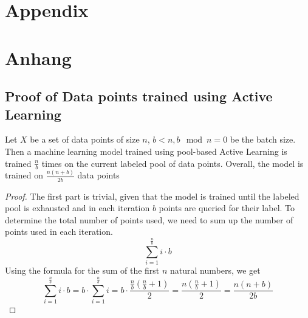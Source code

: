 
{\chapter{Appendix}}    %
{\chapter{Anhang}}      %
\label{chap:appendix}


\section{Proof of Data points trained using Active Learning}
\label{sec:appendix:FirstSection}
\begin{theorem}
Let $X$ be a set of data points of size $n$, $b < n, b \mod n = 0$ be the batch size. Then a machine learning model trained
using pool-based Active Learning is trained $\frac{n}{b}$ times on the current labeled pool of data points. Overall, the model
is trained on $\frac{n(n+b)}{2b}$ data points
\end{theorem}
\begin{proof}
    The first part is trivial, given that the model is trained until the labeled pool is exhausted and in each iteration $b$
    points are queried for their label. To determine the total number of points used, we need to sum up the number of points
    used in each iteration. 
    \begin{equation}
        \sum_{i=1}^{\frac{n}{b}} i \cdot b
    \end{equation}
    Using the formula for the sum of the first $n$ natural numbers, we get
    \begin{equation}
        \sum_{i=1}^{\frac{n}{b}} i \cdot b = b \cdot \sum_{i=1}^{\frac{n}{b}} i = b \cdot \frac{\frac{n}{b} (\frac{n}{b} + 1)}{2}
        = \frac{n (\frac{n}{b} + 1)}{2} = \frac{n(n+b)}{2b}
    \end{equation}
\end{proof}
		
